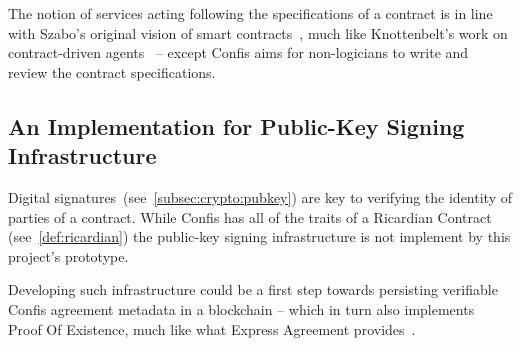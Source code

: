 The notion of services acting following the specifications of a contract is in line with Szabo's original vision of smart contracts~\cite{szabo1997smart-contracts}, much like Knottenbelt's work on contract-driven agents~\cite{knottenbeltContractDriven} -- except Confis aims for non-logicians to write and review the contract specifications.

\subsection{An Implementation for Public-Key Signing Infrastructure}\label{subsec:future:signing}

Digital signatures~(see~\autoref{subsec:crypto:pubkey}) are key to verifying the identity of parties of a contract.
While Confis has all of the traits of a Ricardian Contract (see~\autoref{def:ricardian}) the public-key signing infrastructure is not implement by this project's prototype.

Developing such infrastructure could be a first step towards persisting verifiable Confis agreement metadata in a blockchain -- which in turn also implements Proof Of Existence, much like what Express Agreement provides~\cite{expressAgreement}.
